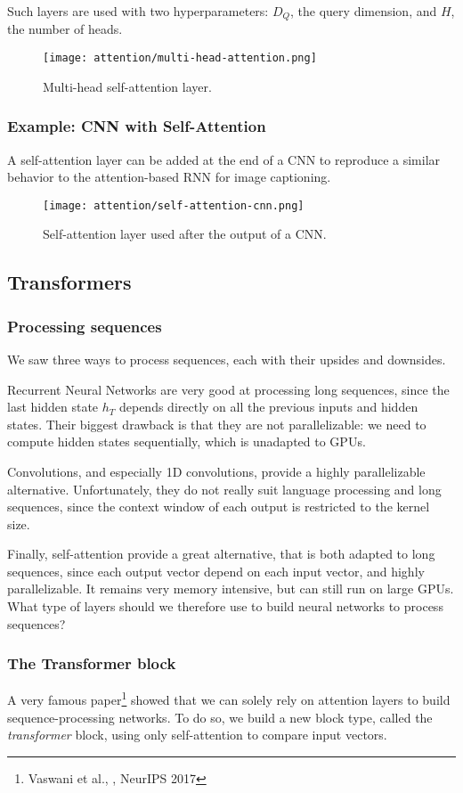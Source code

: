 Such layers are used with two hyperparameters: $D_Q$, the query dimension, and $H$, the number of heads.
\begin{figure}[H]
    \centering
    \texttt{[image: attention/multi-head-attention.png]}
    \caption{Multi-head self-attention layer.}
\end{figure}

\subsubsection{Example: CNN with Self-Attention}
A self-attention layer can be added at the end of a CNN to reproduce a similar behavior to the attention-based RNN for image captioning.
\begin{figure}[H]
    \centering
    \texttt{[image: attention/self-attention-cnn.png]}
    \caption{Self-attention layer used after the output of a CNN.}
\end{figure}

\subsection{Transformers}
\subsubsection{Processing sequences}
We saw three ways to process sequences, each with their upsides and downsides.

Recurrent Neural Networks are very good at processing long sequences, since the last hidden state $h_T$ depends directly on all the previous inputs and hidden states. Their biggest drawback is that they are not parallelizable: we need to compute hidden states sequentially, which is unadapted to GPUs. 

Convolutions, and especially 1D convolutions, provide a highly parallelizable alternative. Unfortunately, they do not really suit language processing and long sequences, since the context window of each output is restricted to the kernel size.

Finally, self-attention provide a great alternative, that is both adapted to long sequences, since each output vector depend on each input vector, and highly parallelizable. It remains very memory intensive, but can still run on large GPUs. What type of layers should we therefore use to build neural networks to process sequences?

\subsubsection{The Transformer block}
A very famous paper\footnote{Vaswani et al., , NeurIPS 2017} showed that we can solely rely on attention layers to build sequence-processing networks. To do so, we build a new block type, called the \emph{transformer} block, using only self-attention to compare input vectors.

